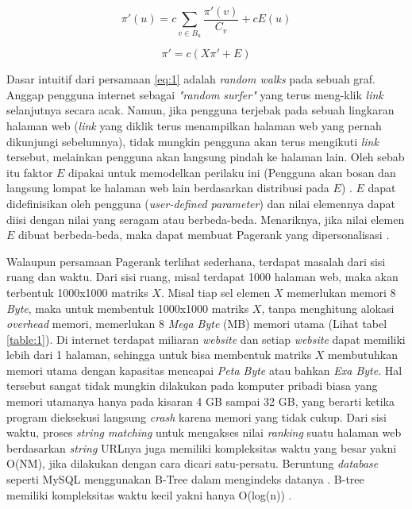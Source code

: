\begin{equation}
	\label{eq:1}
	\pi'(u) = c\sum_{v\in B_u} \frac{\pi'(v)}{C_v} + cE(u)
\end{equation}

\begin{equation}
	\label{eq:2}
	\pi'=c(X\pi' + E)
\end{equation}

Dasar intuitif dari persamaan \ref{eq:1} adalah \textit{random walks} pada sebuah graf. Anggap pengguna internet sebagai \textit{"random surfer"} yang terus meng-klik \textit{link} selanjutnya secara acak. Namun, jika pengguna terjebak pada sebuah lingkaran halaman web (\textit{link} yang diklik terus menampilkan halaman web yang pernah dikunjungi sebelumnya), tidak mungkin pengguna akan terus mengikuti \textit{link} tersebut, melainkan pengguna akan langsung pindah ke halaman lain. Oleh sebab itu faktor $E$ dipakai untuk memodelkan perilaku ini (Pengguna akan bosan dan langsung lompat ke halaman web lain berdasarkan distribusi pada $E$) \citep{ilprints422}. $E$ dapat didefinisikan oleh pengguna (\textit{user-defined parameter}) dan nilai elemennya dapat diisi dengan nilai yang seragam atau berbeda-beda. Menariknya, jika nilai elemen $E$ dibuat berbeda-beda, maka dapat membuat Pagerank yang dipersonalisasi \citep{ilprints422}.

Walaupun persamaan Pagerank terlihat sederhana, terdapat masalah dari sisi ruang dan waktu. Dari sisi ruang, misal terdapat 1000 halaman web, maka akan terbentuk 1000x1000 matriks $X$. Misal tiap sel elemen $X$ memerlukan memori 8 \textit{Byte}, maka untuk membentuk 1000x1000 matriks $X$, tanpa menghitung alokasi \textit{overhead} memori, memerlukan 8 \textit{Mega Byte} (MB) memori utama (Lihat tabel \ref{table:1}). Di internet terdapat miliaran \textit{website} dan setiap \textit{website} dapat memiliki lebih dari 1 halaman, sehingga untuk bisa membentuk matriks $X$ membutuhkan memori utama dengan kapasitas mencapai \textit{Peta Byte} atau bahkan \textit{Exa Byte}. Hal tersebut sangat tidak mungkin dilakukan pada komputer pribadi biasa yang memori utamanya hanya pada kisaran 4 GB sampai 32 GB, yang berarti ketika program dieksekusi langsung \textit{crash} karena memori yang tidak cukup. Dari sisi waktu, proses \textit{string matching} untuk mengakses nilai \textit{ranking} suatu halaman web berdasarkan \textit{string} URLnya juga memiliki kompleksitas waktu yang besar yakni O(NM), jika dilakukan dengan cara dicari satu-persatu. Beruntung \textit{database} seperti MySQL menggunakan B-Tree dalam mengindeks datanya \citep{mysqlIndex}. B-tree memiliki kompleksitas waktu kecil yakni hanya O(log(n)) \citep{geeksForGeeksBtree}.

